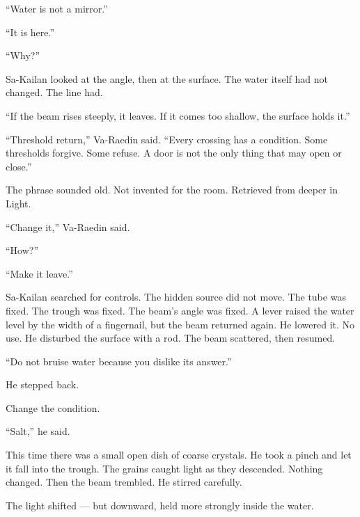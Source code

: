 “Water is not a mirror.”\par

“It is here.”\par

“Why?”\par

Sa-Kailan looked at the angle, then at the surface.
The water itself had not changed.
The line had.\par

“If the beam rises steeply, it leaves.
If it comes too shallow, the surface holds it.”\par

“Threshold return,” Va-Raedin said.
“Every crossing has a condition.
Some thresholds forgive.
Some refuse.
A door is not the only thing that may open or close.”\par

The phrase sounded old.
Not invented for the room.
Retrieved from deeper in Light.\par

“Change it,” Va-Raedin said.\par

“How?”\par

“Make it leave.”\par

Sa-Kailan searched for controls.
The hidden source did not move.
The tube was fixed.
The trough was fixed.
The beam’s angle was fixed.
A lever raised the water level by the width of a fingernail, but the beam returned again.
He lowered it.
No use.
He disturbed the surface with a rod.
The beam scattered, then resumed.\par

“Do not bruise water because you dislike its answer.”\par

He stepped back.\par

Change the condition.\par

“Salt,” he said.\par

This time there was a small open dish of coarse crystals.
He took a pinch and let it fall into the trough.
The grains caught light as they descended.
Nothing changed.
Then the beam trembled.
He stirred carefully.\par

The light shifted — but downward, held more strongly inside the water.\par

